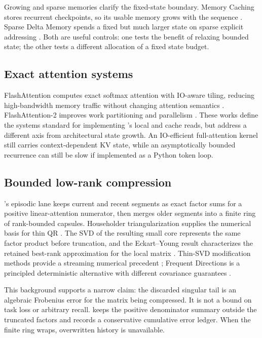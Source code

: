 Growing and sparse memories clarify the fixed-state boundary. Memory Caching
stores recurrent checkpoints, so its usable memory grows with the sequence
\citep{behrouz2026memory}. Sparse Delta Memory spends a fixed but much larger
state on sparse explicit addressing \citep{cabannes2026sparse}. Both are useful
controls: one tests the benefit of relaxing bounded state; the other tests a
different allocation of a fixed state budget.

\subsection{Exact attention systems}

FlashAttention computes exact softmax attention with IO-aware tiling, reducing
high-bandwidth memory traffic without changing attention semantics
\citep{dao2022flashattention}. FlashAttention-2 improves work partitioning and
parallelism \citep{dao2024flashattention2}. These works define the systems
standard for implementing \ALUCLU's local and cache reads, but address a
different axis from architectural state growth. An IO-efficient full-attention
kernel still carries context-dependent KV state, while an asymptotically
bounded recurrence can still be slow if implemented as a Python token loop.

\subsection{Bounded low-rank compression}

\ALUCLU's episodic lane keeps current and recent segments as exact factor sums
for a positive linear-attention numerator, then merges older segments into a
finite ring of rank-bounded capsules. Householder triangularization supplies
the numerical basis for thin QR \citep{householder1958unitary}. The SVD of the
resulting small core represents the same factor product before truncation, and
the Eckart--Young result characterizes the retained best-rank approximation
for the local matrix \citep{eckart1936approximation}. Thin-SVD modification
methods provide a streaming numerical precedent \citep{brand2006fast};
Frequent Directions is a principled deterministic alternative with different
covariance guarantees \citep{ghashami2016frequent}.

This background supports a narrow claim: the discarded singular tail is an
algebraic Frobenius error for the matrix being compressed. It is not a bound on
task loss or arbitrary recall. \ALUCLU keeps the positive denominator summary
outside the truncated factors and records a conservative cumulative error
ledger. When the finite ring wraps, overwritten history is unavailable.

